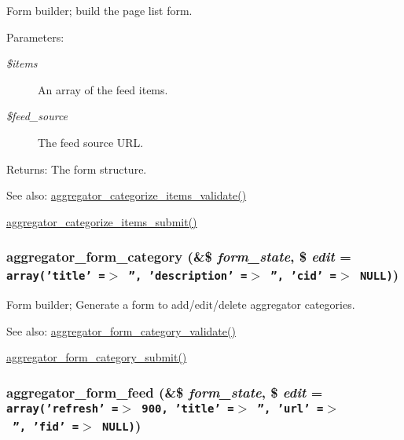 Form builder; build the page list form.

\begin{Desc}
\item[Parameters:]
\begin{description}
\item[{\em \$items}]An array of the feed items. \item[{\em \$feed\_\-source}]The feed source URL. \end{description}
\end{Desc}
\begin{Desc}
\item[Returns:]The form structure.\end{Desc}
\begin{Desc}
\item[See also:]\hyperlink{aggregator_8pages_8inc_e71e8db5c9acc1c94e1d3f30245525d0}{aggregator\_\-categorize\_\-items\_\-validate()} 

\hyperlink{aggregator_8pages_8inc_04d005d45c0430ec3b97884ef4470d4f}{aggregator\_\-categorize\_\-items\_\-submit()} \end{Desc}
\hypertarget{group__forms_g2d93d2170760482c7f1fc28ae1549769}{
\subsubsection[{aggregator\_\-form\_\-category}]{\setlength{\rightskip}{0pt plus 5cm}aggregator\_\-form\_\-category (\&\$ {\em form\_\-state}, \/  \$ {\em edit} = {\tt array('title'~=$>$~'',~'description'~=$>$~'',~'cid'~=$>$~NULL)})}}
\label{group__forms_g2d93d2170760482c7f1fc28ae1549769}


Form builder; Generate a form to add/edit/delete aggregator categories.

\begin{Desc}
\item[See also:]\hyperlink{aggregator_8admin_8inc_419c55e35895dea1f41d5b31908883d5}{aggregator\_\-form\_\-category\_\-validate()} 

\hyperlink{aggregator_8admin_8inc_56c1cadf416d17bd8dd8a53cc6ed5aeb}{aggregator\_\-form\_\-category\_\-submit()} \end{Desc}
\hypertarget{group__forms_gf9a13eb9b0448eec9662f0b73c930bca}{
\subsubsection[{aggregator\_\-form\_\-feed}]{\setlength{\rightskip}{0pt plus 5cm}aggregator\_\-form\_\-feed (\&\$ {\em form\_\-state}, \/  \$ {\em edit} = {\tt array('refresh'~=$>$~900,~'title'~=$>$~'',~'url'~=$>$~'',~'fid'~=$>$~NULL)})}}
\label{group__forms_gf9a13eb9b0448eec9662f0b73c930bca}


